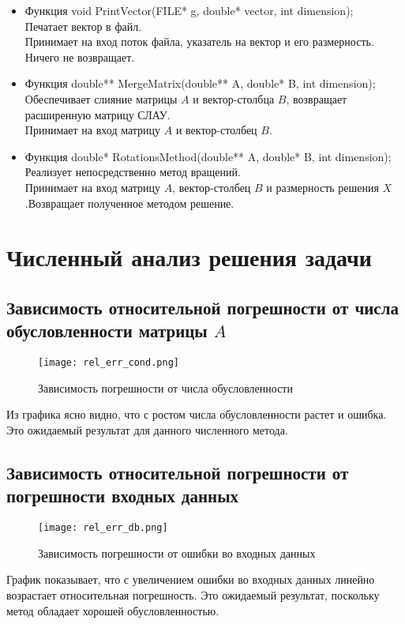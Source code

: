 \documentclass[12pt]{article}
\begin{document}
\begin{itemize}
\item  Функция void PrintVector(FILE* g, double* vector, int dimension);\\
Печатает вектор в файл.\\
Принимает на вход поток файла, указатель на вектор и его размерность. Ничего не возвращает.\\
\item Функция double** MergeMatrix(double** A, double* B, int dimension);\\
Обеспечивает слияние матрицы $A$ и вектор-столбца $B$, возвращает расширенную матрицу СЛАУ.\\
Принимает на вход матрицу $A$ и вектор-столбец $B$.\\
\item Функция double* RotationsMethod(double** A, double* B, int dimension);\\
Реализует непосредственно метод вращений.\\
Принимает на вход матрицу $A$, вектор-столбец $B$ и размерность решения $X$.Возвращает полученное методом решение.
\end{itemize}











\section{Численный анализ решения задачи}
\subsection{Зависимость относительной погрешности от числа обусловленности матрицы $A$}
\begin{figure}[h!]
\center
\texttt{[image: rel\_err\_cond.png]}
\caption{Зависимость погрешности от числа обусловленности}
\label{error_cond}
\end{figure}
Из графика ясно видно, что с ростом числа обусловленности растет и ошибка. Это ожидаемый результат для данного численного метода.

\newpage
\subsection{Зависимость относительной погрешности от погрешности входных данных}
\begin{figure}[h!]
\center
\texttt{[image: rel\_err\_db.png]}
\caption{Зависимость погрешности от ошибки во входных данных}
\label{error_errorData}
\end{figure}
График показывает, что с увеличением ошибки во входных данных линейно возрастает относительная погрешность. Это ожидаемый результат, поскольку метод обладает хорошей обусловленностью.
\newpage
\end{document}
